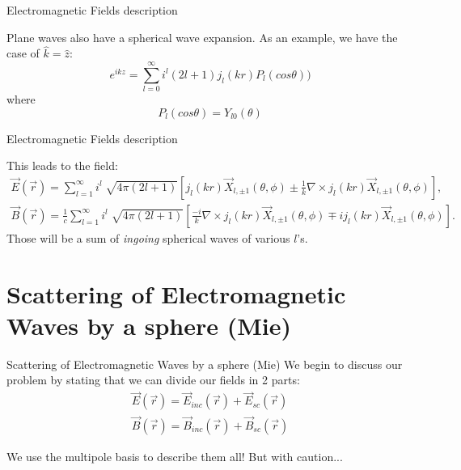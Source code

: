 \documentclass[10pt]{beamer}
\begin{document}
\begin{frame}[fragile]{Electromagnetic Fields description}

Plane waves also have a spherical wave expansion. As an example, we have the case of $\hat{k}=\hat{z}$:
      \begin{equation*}
          e^{ikz}= \sum_{l=0}^{\infty}i^l(2l+1)j_l(kr)P_l(cos\theta))
      \end{equation*}
      where
      \begin{equation*}
          P_l(cos\theta)=Y_{l0}(\theta)
      \end{equation*}


\end{frame}


\begin{frame}[fragile]{Electromagnetic Fields description}

This leads to the field:
      \begin{equation*}
      \begin{split}
          \vec{E}(\vec{r})=\sum_{l=1}^{\infty}i^l\sqrt[]{4\pi(2l+1)}\left[j_l(kr)\vec{X}_{l,\pm1}(\theta,\phi) \pm \frac{1}{k}\nabla \times j_l(kr)\vec{X}_{l,\pm1}(\theta,\phi)  \right],\\
          \vec{B}(\vec{r})=\frac{1}{c}\sum_{l=1}^{\infty}i^l\sqrt[]{4\pi(2l+1)}\left[ \frac{-i}{k}\nabla \times j_l(kr)\vec{X}_{l,\pm1}(\theta,\phi) \mp  ij_l(kr)\vec{X}_{l,\pm1}(\theta,\phi)\right].
      \end{split}
      \end{equation*}
Those will be a sum of \emph{ingoing} spherical waves of various $l$'s.
\end{frame}


\section{Scattering of Electromagnetic Waves by a sphere (Mie)}


\begin{frame}[fragile]{Scattering of Electromagnetic Waves by a sphere (Mie)}
We begin to discuss our problem by stating that we can divide our fields in 2 parts:
      \begin{equation*}
      \begin{split}
          \vec{E}(\vec{r}) = \vec{E}_{inc}(\vec{r}) + \vec{E}_{sc}(\vec{r})\\
          \vec{B}(\vec{r}) = \vec{B}_{inc}(\vec{r}) + \vec{B}_{sc}(\vec{r})
      \end{split}
      \end{equation*}

      We use the multipole basis to describe them all! But with caution...

\end{frame}
\end{document}
